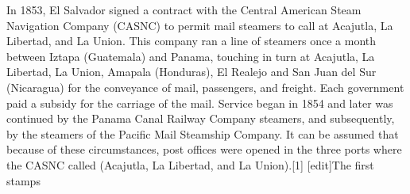 In 1853, El Salvador signed a contract with the Central American Steam Navigation Company (CASNC) to permit mail steamers to call at Acajutla, La Libertad, and La Union. This company ran a line of steamers once a month between Iztapa (Guatemala) and Panama, touching in turn at Acajutla, La Libertad, La Union, Amapala (Honduras), El Realejo and San Juan del Sur (Nicaragua) for the conveyance of mail, passengers, and freight. Each government paid a subsidy for the carriage of the mail. Service began in 1854 and later was continued by the Panama Canal Railway Company steamers, and subsequently, by the steamers of the Pacific Mail Steamship Company. It can be assumed that because of these circumstances, post offices were opened in the three ports where the CASNC called (Acajutla, La Libertad, and La Union).[1]
[edit]The first stamps



